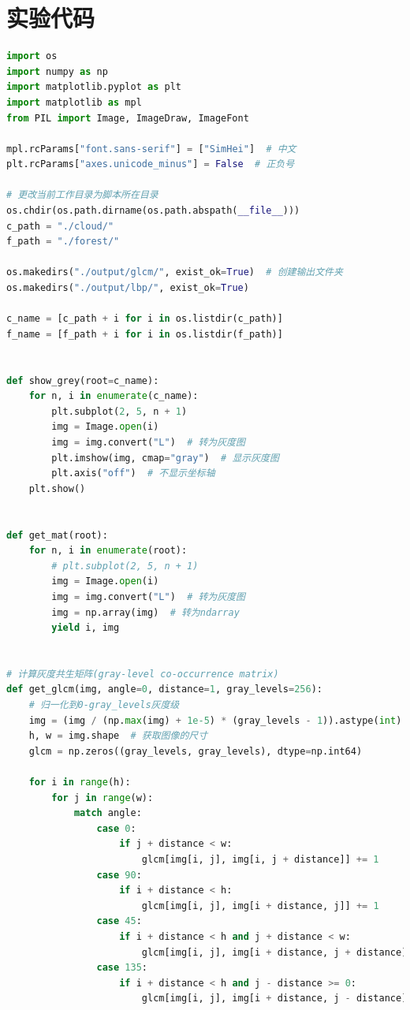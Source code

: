\documentclass[a4paper,12pt]{report}
\begin{document}
\section{实验代码}
\begin{lstlisting}[language=Python]
import os
import numpy as np
import matplotlib.pyplot as plt
import matplotlib as mpl
from PIL import Image, ImageDraw, ImageFont

mpl.rcParams["font.sans-serif"] = ["SimHei"]  # 中文
plt.rcParams["axes.unicode_minus"] = False  # 正负号

# 更改当前工作目录为脚本所在目录
os.chdir(os.path.dirname(os.path.abspath(__file__)))
c_path = "./cloud/"
f_path = "./forest/"

os.makedirs("./output/glcm/", exist_ok=True)  # 创建输出文件夹
os.makedirs("./output/lbp/", exist_ok=True)

c_name = [c_path + i for i in os.listdir(c_path)]
f_name = [f_path + i for i in os.listdir(f_path)]


def show_grey(root=c_name):
    for n, i in enumerate(c_name):
        plt.subplot(2, 5, n + 1)
        img = Image.open(i)
        img = img.convert("L")  # 转为灰度图
        plt.imshow(img, cmap="gray")  # 显示灰度图
        plt.axis("off")  # 不显示坐标轴
    plt.show()


def get_mat(root):
    for n, i in enumerate(root):
        # plt.subplot(2, 5, n + 1)
        img = Image.open(i)
        img = img.convert("L")  # 转为灰度图
        img = np.array(img)  # 转为ndarray
        yield i, img


# 计算灰度共生矩阵(gray-level co-occurrence matrix)
def get_glcm(img, angle=0, distance=1, gray_levels=256):
    # 归一化到0-gray_levels灰度级
    img = (img / (np.max(img) + 1e-5) * (gray_levels - 1)).astype(int)
    h, w = img.shape  # 获取图像的尺寸
    glcm = np.zeros((gray_levels, gray_levels), dtype=np.int64)

    for i in range(h):
        for j in range(w):
            match angle:
                case 0:
                    if j + distance < w:
                        glcm[img[i, j], img[i, j + distance]] += 1
                case 90:
                    if i + distance < h:
                        glcm[img[i, j], img[i + distance, j]] += 1
                case 45:
                    if i + distance < h and j + distance < w:
                        glcm[img[i, j], img[i + distance, j + distance]] += 1
                case 135:
                    if i + distance < h and j - distance >= 0:
                        glcm[img[i, j], img[i + distance, j - distance]] += 1


\end{lstlisting}
\end{document}
